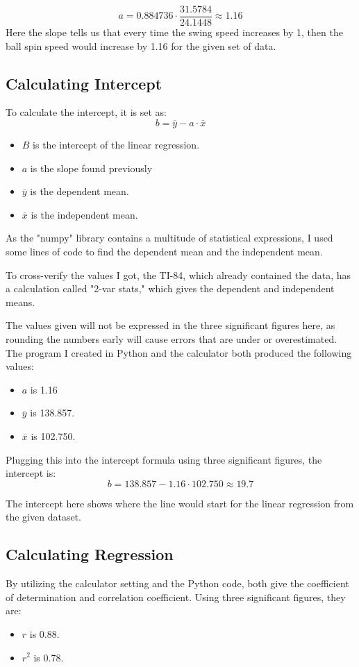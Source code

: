 \documentclass[12pt]{article}
\begin{document}
\[
a =  0.884736 \cdot \frac{31.5784}{24.1448} \approx 1.16
\]
Here the slope tells us that every time the swing speed increases by 1, then the ball spin speed would increase by 1.16 for the given set of data.

\subsection*{Calculating Intercept}
\hspace{1em}To calculate the intercept, it is set as:
\[
b= \overline{y} - a \cdot \overline{x}
\]
\begin{itemize}
  \item \(B\) is the intercept of the linear regression.
  \item \(a\) is the slope found previously 
  \item \(\overline{y}\) is the dependent mean.
\item \(\overline{x}\) is the independent mean.
\end{itemize}
As the "numpy" library contains a multitude of statistical expressions, I used some lines of code to find the dependent mean and the independent mean.

To cross-verify the values I got, the TI-84, which already contained the data, has a calculation called "2-var stats," which gives the dependent and independent means.

The values given will not be expressed in the three significant figures here, as rounding the numbers early will cause errors that are under or overestimated. The program I created in Python and the calculator both produced the following values:
\begin{itemize}
  \item \(a\) is 1.16 
\item \(\overline{y}\) is 138.857.
\item \(\overline{x}\) is 102.750.
\end{itemize}
Plugging this into the intercept formula using three significant figures, the intercept is:
\[ 
b= 138.857 - 1.16 \cdot 102.750 \approx 19.7
\]

The intercept here shows where the line would start for the linear regression from the given dataset.
\subsection*{Calculating Regression}


By utilizing the calculator setting and the Python code, both give the coefficient of determination and correlation coefficient. Using three significant figures, they are:
\begin{itemize}
\item \(r\) is 0.88.
\item \(r^2\) is 0.78.
\end{itemize}
\end{document}
